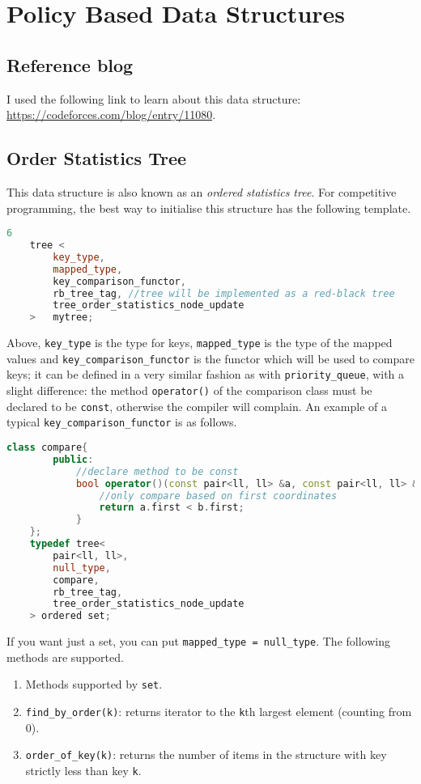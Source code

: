 \documentclass[12pt,a4paper]{amsart}
\numberwithin{equation}{section}
\theoremstyle{definition}
\begin{document}
\section{Policy Based Data Structures}
\subsection{Reference blog} I used the following link to learn about this data structure:  \url{https://codeforces.com/blog/entry/11080}.

\subsection{Order Statistics Tree} This data structure is also known as an \textit{ordered statistics tree}. For competitive programming, the best way to initialise this structure has the following template. 
\begin{lstlisting}[language=C++]6
	tree <
		key_type,
		mapped_type,
		key_comparison_functor,
		rb_tree_tag, //tree will be implemented as a red-black tree
		tree_order_statistics_node_update
	>	mytree;
\end{lstlisting}
Above, \verb|key_type| is the type for keys, \verb|mapped_type| is the type of the mapped values and \verb|key_comparison_functor| is the functor which will be used to compare keys; it can be defined in a very similar fashion as with \verb|priority_queue|, with a slight difference: the method \verb|operator()| of the comparison class must be declared to be \verb|const|, otherwise the compiler will complain. An example of a typical \verb|key_comparison_functor| is as follows. 
\begin{lstlisting}[language=C++]
	class compare{
		public:
			//declare method to be const
			bool operator()(const pair<ll, ll> &a, const pair<ll, ll> &b) const{
				//only compare based on first coordinates
				return a.first < b.first;
			}
	};
	typedef tree<
		pair<ll, ll>,
		null_type,
		compare,
		rb_tree_tag,
		tree_order_statistics_node_update
	> ordered set;

\end{lstlisting} 

If you want just a set, you can put \verb|mapped_type = null_type|. The following methods are supported.
\begin{enumerate}
	\item Methods supported by \verb|set|.
	\item \verb|find_by_order(k)|: returns iterator to the \verb|k|th largest element (counting from 0). 
	\item \verb|order_of_key(k)|: returns the number of items in the structure with key strictly less than key \verb|k|. 
\end{enumerate}
\end{document}
